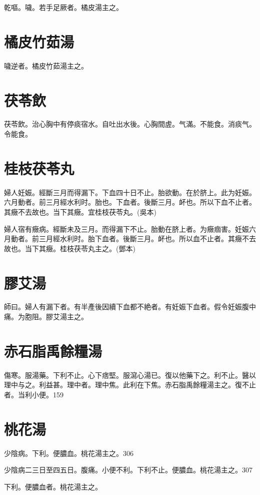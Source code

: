 \documentclass[12pt,twoside,UTF8,b5paper]{ctexbook}
\begin{document}
乾嘔。噦。若手足厥者。橘皮湯主之。

\section{橘皮竹茹湯}

噦逆者。橘皮竹茹湯主之。

\section{茯苓飲}

茯苓飲。治心胸中有停痰宿水。自吐出水後。心胸間虗。气滿。不能食。消痰气。令能食。

\section{桂枝茯苓丸}

婦人妊娠。經斷三月而得漏下。下血四十日不止。胎欲動。在於脐上。此为妊娠。六月動者。前三月經水利时。胎也。下血者。後斷三月。衃也。所以下血不止者。其癥不去故也。当下其癥。宜桂枝茯苓丸。(吳本)

婦人宿有癥病。經斷未及三月。而得漏下不止。胎動在脐上者。为癥痼害。妊娠六月動者。前三月經水利时。胎下血者。後斷三月。衃也。所以血不止者。其癥不去故也。当下其癥。桂枝茯苓丸主之。(鄧本)

\section{膠艾湯}

師曰。婦人有漏下者。有半產後因續下血都不絶者。有妊娠下血者。假令妊娠腹中痛。为胞阻。膠艾湯主之。

\section{赤石脂禹餘糧湯}

傷寒。服湯藥。下利不止。心下痞堅。服瀉心湯已。復以他藥下之。利不止。醫以理中与之。利益甚。理中者。理中焦。此利在下焦。赤石脂禹餘糧湯主之。復不止者。当利小便。159

\section{桃花湯}

少陰病。下利。便膿血。桃花湯主之。306

少陰病二三日至四五日。腹痛。小便不利。下利不止。便膿血。桃花湯主之。307

下利。便膿血者。桃花湯主之。
\end{document}
